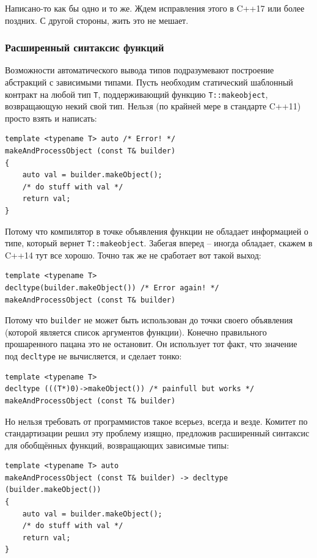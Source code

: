 \documentclass[a4paper,12pt,oneside]{article}
\begin{document}
Написано-то как бы одно и то же. Ждем исправления этого в C++17 или более поздних. С другой стороны, жить это не мешает.
\fi

\subsubsection{Расширенный синтаксис функций}\label{DeclFunctions}

Возможности автоматического вывода типов подразумевают построение абстракций с зависимыми типами. Пусть необходим статический шаблонный контракт на любой тип \lstinline!T!, поддерживающий функцию \lstinline!T::makeobject!, возвращающую некий свой тип. Нельзя (по крайней мере в стандарте C++11) просто взять и написать:

\begin{lstlisting}
template <typename T> auto /* Error! */
makeAndProcessObject (const T& builder)
{
    auto val = builder.makeObject();
    /* do stuff with val */
    return val;
}
\end{lstlisting}

Потому что компилятор в точке объявления функции не обладает информацией о типе, который вернет \lstinline!T::makeobject!. Забегая вперед -- иногда обладает, скажем в C++14 тут все хорошо. Точно так же не сработает вот такой выход:

\begin{lstlisting}
template <typename T> 
decltype(builder.makeObject()) /* Error again! */
makeAndProcessObject (const T& builder)
\end{lstlisting}

Потому что \lstinline!builder! не может быть использован до точки своего объявления (которой является список аргументов функции). Конечно правильного прошаренного пацана это не остановит. Он использует тот факт, что значение под \lstinline!decltype! не вычисляется, и сделает тонко:

\begin{lstlisting}
template <typename T> 
decltype (((T*)0)->makeObject()) /* painfull but works */
makeAndProcessObject (const T& builder)
\end{lstlisting}

Но нельзя требовать от программистов такое всерьез, всегда и везде. Комитет по стандартизации решил эту проблему изящно, предложив расширенный синтаксис для обобщённых функций, возвращающих зависимые типы:

\begin{lstlisting}
template <typename T> auto
makeAndProcessObject (const T& builder) -> decltype (builder.makeObject())
{
    auto val = builder.makeObject();
    /* do stuff with val */
    return val;
}
\end{lstlisting}
\end{document}
